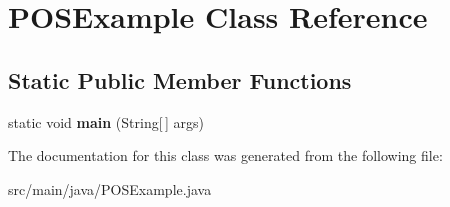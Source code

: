 \hypertarget{classPOSExample}{}\section{P\+O\+S\+Example Class Reference}
\label{classPOSExample}
\subsection*{Static Public Member Functions}
\begin{DoxyCompactItemize}
\item 
\mbox{\label{classPOSExample_ab8d123db4d4e6c4de7c889959a77c9e5}} 
static void {\bfseries main} (String\mbox{[}$\,$\mbox{]} args)
\end{DoxyCompactItemize}


The documentation for this class was generated from the following file\+:\begin{DoxyCompactItemize}
\item 
src/main/java/P\+O\+S\+Example.\+java\end{DoxyCompactItemize}
